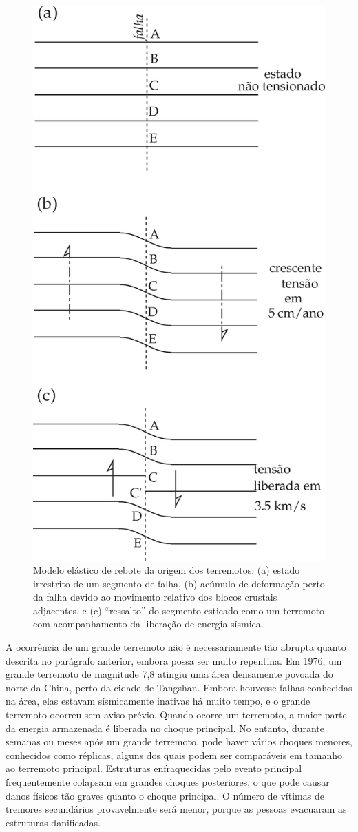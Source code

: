 \documentclass[]{book}
\theoremstyle{definition}
\theoremstyle{definition}
\theoremstyle{definition}
\theoremstyle{remark}
\begin{document}
\begin{figure}

{\centering \includegraphics[width=0.4\linewidth]{fig/Fig_03.15} 

}

\caption{Modelo elástico de rebote da origem dos terremotos: (a) estado irrestrito de um segmento de falha, (b) acúmulo de deformação perto da falha devido ao movimento relativo dos blocos crustais adjacentes, e (c) “ressalto” do segmento esticado como um terremoto com acompanhamento da liberação de energia sísmica.}\label{fig:rebote}
\end{figure}

A ocorrência de um grande terremoto não é necessariamente tão abrupta quanto descrita no parágrafo anterior, embora possa ser muito repentina. Em 1976, um grande terremoto de magnitude 7,8 atingiu uma área densamente povoada do norte da China, perto da cidade de Tangshan. Embora houvesse falhas conhecidas na área, elas estavam sísmicamente inativas há muito tempo, e o grande terremoto ocorreu sem aviso prévio. Quando ocorre um terremoto, a maior parte da energia armazenada é liberada no choque principal. No entanto, durante semanas ou meses após um grande terremoto, pode haver vários choques menores, conhecidos como réplicas, alguns dos quais podem ser comparáveis em tamanho ao terremoto principal. Estruturas enfraquecidas pelo evento principal frequentemente colapsam em grandes choques posteriores, o que pode causar danos físicos tão graves quanto o choque principal. O número de vítimas de tremores secundários provavelmente será menor, porque as pessoas evacuaram as estruturas danificadas.
\end{document}
